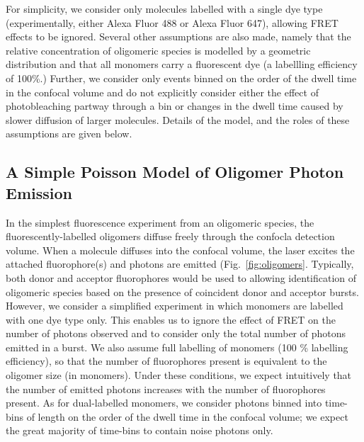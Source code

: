 For simplicity, we consider only molecules labelled with a single dye type (experimentally, either Alexa Fluor 488 or Alexa Fluor 647), allowing FRET effects to be ignored. Several other assumptions are also made, namely that the relative concentration of oligomeric species is modelled by a geometric distribution and that all monomers carry a fluorescent dye (a labellling efficiency of 100\%.) Further, we consider only events binned on the order of the dwell time in the confocal volume and do not explicitly consider either the effect of photobleaching partway through a bin or changes in the dwell time caused by slower diffusion of larger molecules. Details of the model, and the roles of these assumptions are given below.

\subsection{A Simple Poisson Model of Oligomer Photon Emission}
In the simplest fluorescence experiment from an oligomeric species, the fluorescently-labelled oligomers diffuse freely through the confocla detection volume.  When a molecule diffuses into the confocal volume, the laser excites the attached fluorophore(s) and photons are emitted (Fig.~\ref{fig:oligomers}. Typically, both donor and acceptor fluorophores would be used to allowing identification of oligomeric species based on the presence of coincident donor and acceptor bursts. However, we consider a simplified experiment in which monomers are labelled with one dye type only. This enables us to ignore the effect of FRET on the number of photons observed and to consider only the total number of photons emitted in a burst. We also assume full labelling of monomers (100 \% labelling efficiency), so that the number of fluorophores present is equivalent to the oligomer size (in monomers). Under these conditions, we expect intuitively that the number of emitted photons increases with the number of fluorophores present. As for dual-labelled monomers, we consider photons binned into time-bins of length on the order of the dwell time in the confocal volume; we expect the great majority of time-bins to contain noise photons only.

